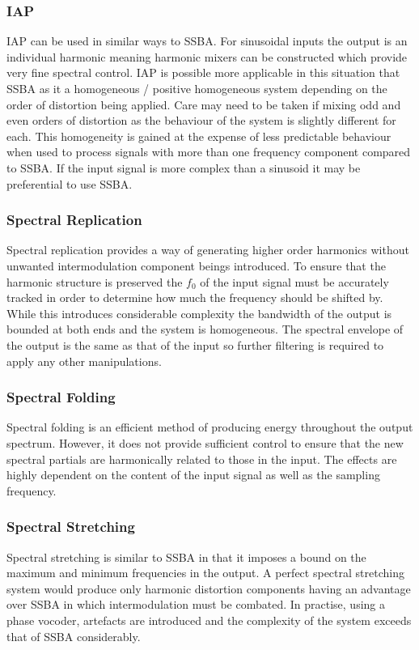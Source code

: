 		\subsubsection*{IAP}
			IAP can be used in similar ways to SSBA. For sinusoidal inputs the output is an individual harmonic
			meaning harmonic mixers can be constructed which provide very fine spectral control. IAP is
			possible more applicable in this situation that SSBA as it a homogeneous / positive homogeneous
			system depending on the order of distortion being applied. Care may need to be taken if mixing odd
			and even orders of distortion as the behaviour of the system is slightly different for each. This
			homogeneity is gained at the expense of less predictable behaviour when used to process signals
			with more than one frequency component compared to SSBA. If the input signal is more complex than a
			sinusoid it may be preferential to use SSBA.

		\subsubsection*{Spectral Replication}
			Spectral replication provides a way of generating higher order harmonics without unwanted
			intermodulation component beings introduced. To ensure that the harmonic structure is preserved the
			$f_{0}$ of the input signal must be accurately tracked in order to determine how much the frequency
			should be shifted by. While this introduces considerable complexity the bandwidth of the output is
			bounded at both ends and the system is homogeneous. The spectral envelope of the output is the same
			as that of the input so further filtering is required to apply any other manipulations.

		\subsubsection*{Spectral Folding}
			Spectral folding is an efficient method of producing energy throughout the output spectrum.
			However, it does not provide sufficient control to ensure that the new spectral partials are
			harmonically related to those in the input. The effects are highly dependent on the content of the
			input signal as well as the sampling frequency.

		\subsubsection*{Spectral Stretching}
			Spectral stretching is similar to SSBA in that it imposes a bound on the maximum and minimum
			frequencies in the output. A perfect spectral stretching system would produce only harmonic
			distortion components having an advantage over SSBA in which intermodulation must be combated. In
			practise, using a phase vocoder, artefacts are introduced and the complexity of the system exceeds
			that of SSBA considerably.

